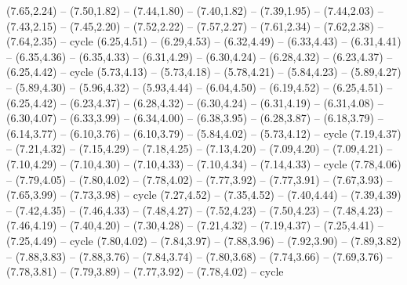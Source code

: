 \expandafter\def\csname geo:gebiet:BDI\endcsname{
  }
\expandafter\def\csname geo:gebiet:ISR\endcsname{
  }
\expandafter\def\csname geo:gebiet:LBN\endcsname{
  }
\expandafter\def\csname geo:gebiet:MDG\endcsname{
  (7.65,2.24) -- (7.50,1.82) -- (7.44,1.80) -- (7.40,1.82) -- (7.39,1.95) -- (7.44,2.03) -- (7.43,2.15) -- (7.45,2.20) -- (7.52,2.22) -- (7.57,2.27) -- (7.61,2.34) -- (7.62,2.38) -- (7.64,2.35) -- cycle}
\expandafter\def\csname geo:gebiet:PSX\endcsname{
  }
\expandafter\def\csname geo:gebiet:GMB\endcsname{
  }
\expandafter\def\csname geo:gebiet:TUN\endcsname{
  (6.25,4.51) -- (6.29,4.53) -- (6.32,4.49) -- (6.33,4.43) -- (6.31,4.41) -- (6.35,4.36) -- (6.35,4.33) -- (6.31,4.29) -- (6.30,4.24) -- (6.28,4.32) -- (6.23,4.37) -- (6.25,4.42) -- cycle}
\expandafter\def\csname geo:gebiet:DZA\endcsname{
  (5.73,4.13) -- (5.73,4.18) -- (5.78,4.21) -- (5.84,4.23) -- (5.89,4.27) -- (5.89,4.30) -- (5.96,4.32) -- (5.93,4.44) -- (6.04,4.50) -- (6.19,4.52) -- (6.25,4.51) -- (6.25,4.42) -- (6.23,4.37) -- (6.28,4.32) -- (6.30,4.24) -- (6.31,4.19) -- (6.31,4.08) -- (6.30,4.07) -- (6.33,3.99) -- (6.34,4.00) -- (6.38,3.95) -- (6.28,3.87) -- (6.18,3.79) -- (6.14,3.77) -- (6.10,3.76) -- (6.10,3.79) -- (5.84,4.02) -- (5.73,4.12) -- cycle}
\expandafter\def\csname geo:gebiet:JOR\endcsname{
  (7.19,4.37) -- (7.21,4.32) -- (7.15,4.29) -- (7.18,4.25) -- (7.13,4.20) -- (7.09,4.20) -- (7.09,4.21) -- (7.10,4.29) -- (7.10,4.30) -- (7.10,4.33) -- (7.10,4.34) -- (7.14,4.33) -- cycle}
\expandafter\def\csname geo:gebiet:ARE\endcsname{
  (7.78,4.06) -- (7.79,4.05) -- (7.80,4.02) -- (7.78,4.02) -- (7.77,3.92) -- (7.77,3.91) -- (7.67,3.93) -- (7.65,3.99) -- (7.73,3.98) -- cycle}
\expandafter\def\csname geo:gebiet:QAT\endcsname{
  }
\expandafter\def\csname geo:gebiet:KWT\endcsname{
  }
\expandafter\def\csname geo:gebiet:IRQ\endcsname{
  (7.27,4.52) -- (7.35,4.52) -- (7.40,4.44) -- (7.39,4.39) -- (7.42,4.35) -- (7.46,4.33) -- (7.48,4.27) -- (7.52,4.23) -- (7.50,4.23) -- (7.48,4.23) -- (7.46,4.19) -- (7.40,4.20) -- (7.30,4.28) -- (7.21,4.32) -- (7.19,4.37) -- (7.25,4.41) -- (7.25,4.49) -- cycle}
\expandafter\def\csname geo:gebiet:OMN\endcsname{
  (7.80,4.02) -- (7.84,3.97) -- (7.88,3.96) -- (7.92,3.90) -- (7.89,3.82) -- (7.88,3.83) -- (7.88,3.76) -- (7.84,3.74) -- (7.80,3.68) -- (7.74,3.66) -- (7.69,3.76) -- (7.78,3.81) -- (7.79,3.89) -- (7.77,3.92) -- (7.78,4.02) -- cycle}
